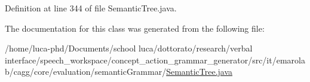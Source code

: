 Definition at line 344 of file Semantic\-Tree.\-java.



The documentation for this class was generated from the following file\-:\begin{DoxyCompactItemize}
\item 
/home/luca-\/phd/\-Documents/school luca/dottorato/research/verbal interface/speech\-\_\-workspace/concept\-\_\-action\-\_\-grammar\-\_\-generator/src/it/emarolab/cagg/core/evaluation/semantic\-Grammar/\hyperlink{SemanticTree_8java}{Semantic\-Tree.\-java}\end{DoxyCompactItemize}
